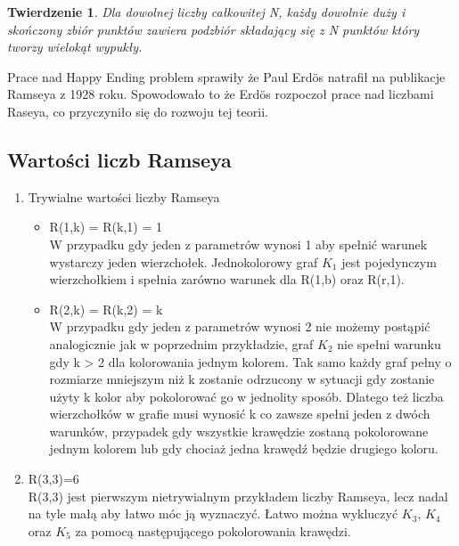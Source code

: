 \documentclass[11pt]{article}
\newtheorem{theorem}{Twierdzenie}
\begin{document}
\begin{theorem}
Dla dowolnej liczby całkowitej N, każdy dowolnie duży i skończony zbiór punktów zawiera podzbiór składający się z N punktów który tworzy wielokąt wypukły.
\end{theorem}

Prace nad Happy Ending problem sprawiły że Paul Erd\"os natrafił na publikacje Ramseya z 1928 roku. Spowodowało to że Erd\"os rozpoczoł prace nad liczbami Raseya, co przyczyniło się do rozwoju tej teorii.

\subsection{Wartości liczb Ramseya}

\begin{enumerate}
  \item Trywialne wartości liczby Ramseya \hfill 
  
  \begin{itemize}
  \item R(1,k) = R(k,1) = 1 \hfill \\
  W przypadku gdy jeden z parametrów wynosi 1 aby spełnić warunek wystarczy jeden wierzchołek.  Jednokolorowy graf $\mathit{K}_{1}$ jest pojedynczym wierzchołkiem i spełnia zarówno warunek dla R(1,b) oraz R(r,1).
  
   \item R(2,k) = R(k,2) = k \hfill \\
	W przypadku gdy jeden z parametrów wynosi 2 nie możemy postąpić analogicznie jak w poprzednim przykładzie, graf $\mathit{K}_{2}$ nie spełni warunku gdy k > 2 dla kolorowania jednym kolorem. Tak samo każdy graf pełny o rozmiarze mniejszym niż k zostanie odrzucony w sytuacji gdy zostanie użyty k kolor aby pokolorować go w jednolity sposób. Dlatego też liczba wierzchołków w grafie musi wynosić k co zawsze spełni jeden z dwóch warunków, przypadek gdy wszystkie krawędzie zostaną pokolorowane jednym kolorem lub gdy chociaż jedna krawędź będzie drugiego koloru.
  	
  \end{itemize}

  
 
  \item R(3,3)=6 \hfill \\ 
  R(3,3) jest pierwszym nietrywialnym przykładem liczby Ramseya, lecz nadal na tyle małą aby łatwo móc ją wyznaczyć. Łatwo można wykluczyć $\mathit{K}_{3}$, $\mathit{K}_{4}$ oraz $\mathit{K}_{5}$ za pomocą następującego pokolorowania krawędzi.
  

\end{enumerate}
\end{document}
